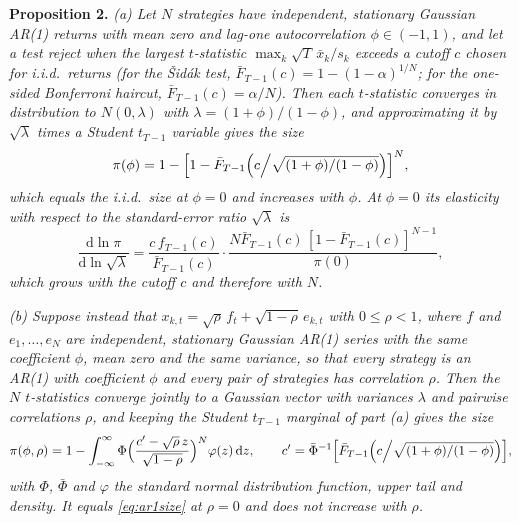 \noindent\textbf{Proposition 2.} \emph{(a) Let $N$ strategies have independent, stationary Gaussian AR(1) returns with mean zero and lag-one autocorrelation $\phi\in(-1,1)$, and let a test reject when the largest $t$-statistic $\max_k\sqrt T\,\bar x_k/s_k$ exceeds a cutoff $c$ chosen for i.i.d.\ returns (for the \v{S}id\'ak test, $\bar F_{T-1}(c)=1-(1-\alpha)^{1/N}$; for the one-sided Bonferroni haircut, $\bar F_{T-1}(c)=\alpha/N$). Then each $t$-statistic converges in distribution to $N(0,\lambda)$ with $\lambda=(1+\phi)/(1-\phi)$, and approximating it by $\sqrt\lambda$ times a Student $t_{T-1}$ variable gives the size}
\begin{equation}
\pi(\phi)=1-\Bigl[1-\bar F_{T-1}\Bigl(c\Big/\sqrt{(1+\phi)/(1-\phi)}\Bigr)\Bigr]^N,
\label{eq:ar1size}
\end{equation}
\emph{which equals the i.i.d.\ size at $\phi=0$ and increases with $\phi$. At $\phi=0$ its elasticity with respect to the standard-error ratio $\sqrt\lambda$ is}
\begin{equation}
\frac{\mathrm d\ln\pi}{\mathrm d\ln\sqrt\lambda}=\frac{c\,f_{T-1}(c)}{\bar F_{T-1}(c)}\cdot\frac{N\bar F_{T-1}(c)\,[1-\bar F_{T-1}(c)]^{N-1}}{\pi(0)},
\label{eq:elasticity}
\end{equation}
\emph{which grows with the cutoff $c$ and therefore with $N$.}

\noindent\emph{(b) Suppose instead that $x_{k,t}=\sqrt\rho\,f_t+\sqrt{1-\rho}\,e_{k,t}$ with $0\le\rho<1$, where $f$ and $e_1,\dots,e_N$ are independent, stationary Gaussian AR(1) series with the same coefficient $\phi$, mean zero and the same variance, so that every strategy is an AR(1) with coefficient $\phi$ and every pair of strategies has correlation $\rho$. Then the $N$ $t$-statistics converge jointly to a Gaussian vector with variances $\lambda$ and pairwise correlations $\rho$, and keeping the Student $t_{T-1}$ marginal of part (a) gives the size}
\begin{equation}
\pi(\phi,\rho)=1-\int_{-\infty}^{\infty}\Phi\Bigl(\frac{c'-\sqrt\rho\,z}{\sqrt{1-\rho}}\Bigr)^N\varphi(z)\,\mathrm dz,\qquad c'=\bar\Phi^{-1}\Bigl[\bar F_{T-1}\Bigl(c\Big/\sqrt{(1+\phi)/(1-\phi)}\Bigr)\Bigr],
\label{eq:ar1corr}
\end{equation}
\emph{with $\Phi$, $\bar\Phi$ and $\varphi$ the standard normal distribution function, upper tail and density. It equals \eqref{eq:ar1size} at $\rho=0$ and does not increase with $\rho$.}

